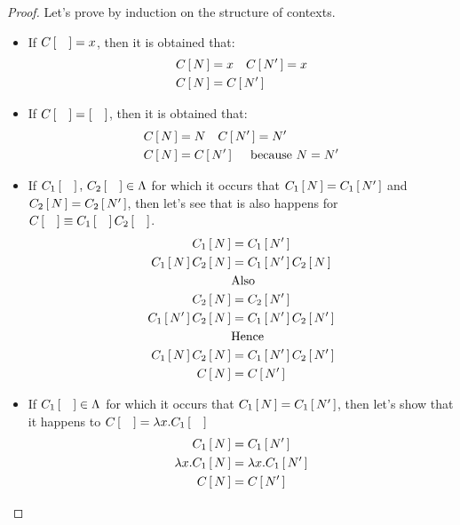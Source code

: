\documentclass[11pt]{article}
\theoremstyle{definition}
\theoremstyle{remark}
\theoremstyle{remark}
\theoremstyle{definition}
\begin{document}
\begin{proof}
  Let's prove by induction on the structure of contexts.
  \begin{itemize}
    \item If $C\cx = x$, then it is obtained that:
          \begin{align*}
            &C\cx[N] = x \quad C\cx[N'] = x \\
            &C\cx[N] = C\cx[N']
          \end{align*}

  \item If $C\cx = \cx$, then it is obtained that:
          \begin{align*}
            &C\cx[N] = N \quad C\cx[N'] = N' \\
            &C\cx[N] = C\cx[N'] \quad \text{ because } N = N'
          \end{align*}

    \item If $C_1\cx, \, C_2\cx \in \Lambda$ for which it occurs that
          $C_1\cx[N] = C_1\cx[N']$ and $C_2\cx[N] = C_2\cx[N']$, then let's see
          that is also happens for $C\cx \equiv C_1\cx C_2\cx$.
          \begin{align*}
            C_1\cx[N] &= C_1\cx[N'] \\
            C_1\cx[N]C_2\cx[N] &= C_1\cx[N']C_2\cx[N] \\
                      &\text{Also} \\
            C_2\cx[N] &= C_2\cx[N'] \\
            C_1\cx[N']C_2\cx[N] &= C_1\cx[N']C_2\cx[N'] \\
                      &\text{Hence} \\
            C_1\cx[N]C_2\cx[N] &= C_1\cx[N']C_2\cx[N'] \\
            C\cx[N] &= C\cx[N']
          \end{align*}
    \item If $C_1\cx \in \Lambda$ for which it occurs that
          $C_1\cx[N] = C_1\cx[N']$, then let's show that it happens to
          $C\cx = \lambda x. C_1\cx$
          \begin{align*}
            C_1\cx[N] &= C_1\cx[N'] \\
            \lambda x. C_1\cx[N] &= \lambda x. C_1\cx[N'] \\
            C\cx[N] &= C\cx[N']
          \end{align*}
  \end{itemize}
\end{proof}
\end{document}
